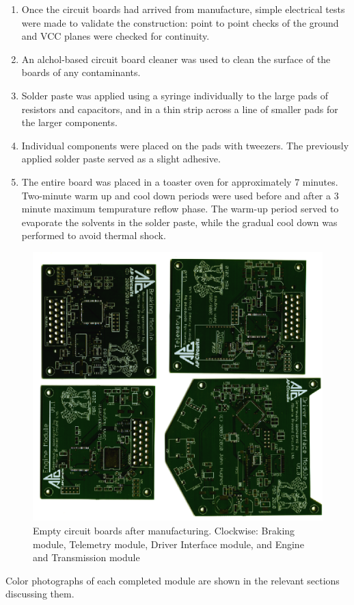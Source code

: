 \begin{enumerate}
  \item Once the circuit boards had arrived from manufacture, simple electrical tests were made to validate the construction: point to point checks of the ground and VCC planes were checked for continuity.
  \item An alchol-based circuit board cleaner was used to clean the surface of the boards of any contaminants.
  \item Solder paste was applied using a syringe individually to the large pads of resistors and capacitors, and in a thin strip across a line of smaller pads for the larger components.
  \item Individual components were placed on the pads with tweezers. The previously applied solder paste served as a slight adhesive.
  \item The entire board was placed in a toaster oven for approximately 7 minutes. Two-minute warm up and cool down periods were used before and after a 3 minute maximum tempurature reflow phase. The warm-up period served to evaporate the solvents in the solder paste, while the gradual cool down was performed to avoid thermal shock.
\end{enumerate}

\begin{figure}[h]
 \centering
 \includegraphics[width=5in,keepaspectratio]{implementation/figures/empty_pcbs.eps}
 \caption{Empty circuit boards after manufacturing. Clockwise: Braking module, Telemetry module, Driver Interface module, and Engine and Transmission module}
 \label{fig:empty_pcbs}
\end{figure}

Color photographs of each completed module are shown in the relevant sections discussing them.